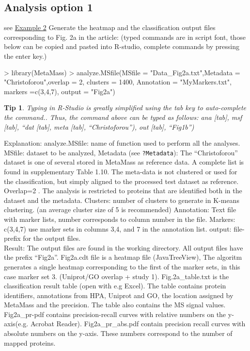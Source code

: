 \documentclass[a4paper]{article}
\numberwithin{equation}{subsection}
\newtheorem*{tip}{Tip}
\begin{document}
\subsection{Analysis option 1}
\label{opt1}
see \hyperref[ex2]{Example 2}
Generate the heatmap and the classification output files corresponding to Fig. 2a in the article:
(typed commands are in script font, those below can be copied and pasted into R-studio, complete commands by pressing the enter key.)
\scriptsize
\begin{Schunk}
\begin{Sinput}
> library(MetaMass)
> analyze.MSfile(MSfile = "Data_Fig2a.txt",Metadata = "Christoforou",overlap = 2, clusters = 1400, Annotation = "MyMarkers.txt", markers =c(3,4,7), output = "Fig2a")
\end{Sinput}
\end{Schunk}
\normalsize
\begin{tip}
Typing in R-Studio is greatly simplified using the tab key to
auto-complete the command.. Thus, the command above can be typed as
follows:  ana [tab], msf [tab], “dat [tab], meta [tab],
“Christoforou”), out [tab], “Fig1b”)
\end{tip}
Explanation: analyze.MSfile: name of function used to perform all the analyses.
MSfile: dataset to be analyzed,
Metadata (see \texttt{?Metadata}): The “Christoforou” dataset is one of several stored in MetaMass as reference data. A complete list is found in supplementary Table 1.10.  The meta-data is not clustered or used for the classification, but simply aligned to the processed test dataset as reference. Overlap=2 . The analysis is restricted to proteins that are identified both in the dataset and the metadata.
Clusters: number of clusters to generate in K-means clustering. (an average cluster size of 5 is recommended)
Annotation: Text file with marker lists, number corresponds to column number in the file. Markers: c(3,4,7) use marker sets in columns 3,4, and 7 in the annotation list.
output: file-prefix for the output files.
\\
Result: The output files are found in the working directory. All output files have the prefix “Fig2a”.
Fig2a.cdt file is a heatmap  file (JavaTreeView), The algoritm generates a single heatmap corresponding to the first of the marker sets, in this case marker set 3. (Uniprot/GO overlap + study 1).
Fig.2a\_table.txt is the classification result table (open with e.g Excel). The table contains protein identifiers, annotations from HPA, Uniprot and GO, the location assigned by MetaMass and the precision. The table also contains the MS signal values.
Fig2a\_pr-pdf contains precision-recall curves with relative numbers on the y-axis(e.g. Acrobat Reader).
Fig2a\_pr\_abs.pdf contain precision recall curves with absolute numbers on the y-axis. These numbers correspond to the number of mapped proteins.
\end{document}
